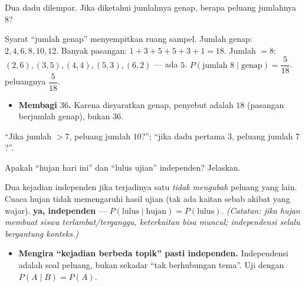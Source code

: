 \begin{soalbox}{}
Dua dadu dilempar. Jika diketahui jumlahnya genap, berapa peluang jumlahnya $8$?
\end{soalbox}

\jawab
{} Syarat ``jumlah genap'' menyempitkan ruang sampel. Jumlah genap:
$2,4,6,8,10,12$. Banyak pasangan: $1+3+5+5+3+1=18$.
 Jumlah $=8$: $(2,6),(3,5),(4,4),(5,3),(6,2)$ --- ada $5$.
 $P(\text{jumlah }8\mid\text{genap})=\dfrac{5}{18}$.
\jadi peluangnya $\dfrac{5}{18}$.

\begin{jebakan}
\begin{itemize}[leftmargin=*,topsep=2pt]
  \item \textbf{Membagi $36$.} Karena disyaratkan genap, penyebut adalah $18$
  (pasangan berjumlah genap), bukan $36$.
\end{itemize}
\end{jebakan}

\begin{variasi}
``Jika jumlah $>7$, peluang jumlah $10$?''; ``jika dadu pertama $3$, peluang
jumlah $7$?''.
\end{variasi}

\begin{soalbox}{}
Apakah ``hujan hari ini'' dan ``lulus ujian'' independen? Jelaskan.
\end{soalbox}

\jawab
{} Dua kejadian independen jika terjadinya satu \emph{tidak mengubah}
peluang yang lain.
 Cuaca hujan tidak memengaruhi hasil ujian (tak ada kaitan sebab
akibat yang wajar).
\jadi \textbf{ya, independen} --- $P(\text{lulus}\mid\text{hujan})=P(\text{lulus})$.
\emph{(Catatan: jika hujan membuat siswa terlambat/terganggu, keterkaitan bisa
muncul; independensi selalu bergantung konteks.)}

\begin{jebakan}
\begin{itemize}[leftmargin=*,topsep=2pt]
  \item \textbf{Mengira ``kejadian berbeda topik'' pasti independen.} Independensi
  adalah soal peluang, bukan sekadar ``tak berhubungan tema''. Uji dengan
  $P(A\mid B)=P(A)$.
\end{itemize}
\end{jebakan}

